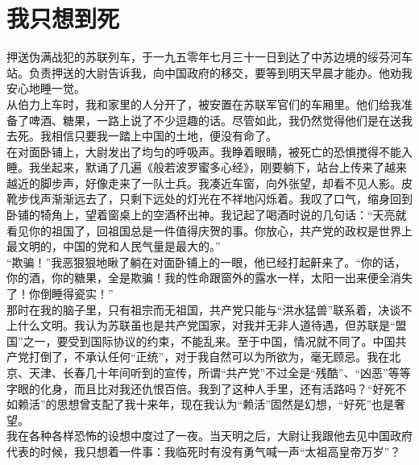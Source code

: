 \fancyhead[RO]{} %
\fancyhead[LE]{} %
\chapter*{我只想到死}
\thispagestyle{empty}
押送伪满战犯的苏联列车，于一九五零年七月三十一日到达了中苏边境的绥芬河车站。负责押送的大尉告诉我，向中国政府的移交，要等到明天早晨才能办。他劝我安心地睡一觉。\\

从伯力上车时，我和家里的人分开了，被安置在苏联军官们的车厢里。他们给我准备了啤酒、糖果，一路上说了不少逗趣的话。尽管如此，我仍然觉得他们是在送我去死。我相信只要我一踏上中国的土地，便没有命了。\\

在对面卧铺上，大尉发出了均匀的呼吸声。我睁着眼睛，被死亡的恐惧搅得不能入睡。我坐起来，默诵了几遍《般若波罗蜜多心经》，刚要躺下，站台上传来了越来越近的脚步声，好像走来了一队士兵。我凑近车窗，向外张望，却看不见人影。皮靴步伐声渐渐远去了，只剩下远处的灯光在不祥地闪烁着。我叹了口气，缩身回到卧铺的犄角上，望着窗桌上的空酒杯出神。我记起了喝酒时说的几句话：“天亮就看见你的祖国了，回祖国总是一件值得庆贺的事。你放心，共产党的政权是世界上最文明的，中国的党和人民气量是最大的。”\\

“欺骗！”我恶狠狠地瞅了躺在对面卧铺上的一眼，他已经打起鼾来了。“你的话，你的酒，你的糖果，全是欺骗！我的性命跟窗外的露水一样，太阳一出来便全消失了！你倒睡得瓷实！”\\

那时在我的脑子里，只有祖宗而无祖国，共产党只能与“洪水猛兽”联系着，决谈不上什么文明。我认为苏联虽也是共产党国家，对我并无非人道待遇，但苏联是“盟国”之一，要受到国际协议的约束，不能乱来。至于中国，情况就不同了。中国共产党打倒了，不承认任何“正统”，对于我自然可以为所欲为，毫无顾忌。我在北京、天津、长春几十年间听到的宣传，所谓“共产党”不过全是“残酷”、“凶恶”等等字眼的化身，而且比对我还仇恨百倍。我到了这种人手里，还有活路吗？“好死不如赖活”的思想曾支配了我十来年，现在我认为“赖活”固然是幻想，“好死”也是奢望。\\

我在各种各样恐怖的设想中度过了一夜。当天明之后，大尉让我跟他去见中国政府代表的时候，我只想着一件事：我临死时有没有勇气喊一声“太祖高皇帝万岁”？\\

